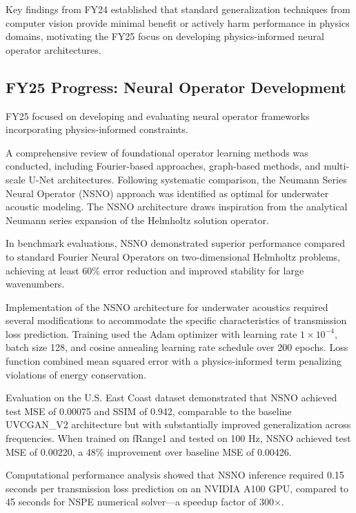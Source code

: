 \documentclass{article}
\begin{document}
Key findings from FY24 established that standard generalization techniques from computer vision provide minimal benefit or actively harm performance in physics domains, motivating the FY25 focus on developing physics-informed neural operator architectures.

\subsection{FY25 Progress: Neural Operator Development}

FY25 focused on developing and evaluating neural operator frameworks incorporating physics-informed constraints.

A comprehensive review of foundational operator learning methods was conducted, including Fourier-based approaches, graph-based methods, and multi-scale U-Net architectures. Following systematic comparison, the Neumann Series Neural Operator (NSNO) approach was identified as optimal for underwater acoustic modeling. The NSNO architecture draws inspiration from the analytical Neumann series expansion of the Helmholtz solution operator.

In benchmark evaluations, NSNO demonstrated superior performance compared to standard Fourier Neural Operators on two-dimensional Helmholtz problems, achieving at least 60\% error reduction and improved stability for large wavenumbers.

Implementation of the NSNO architecture for underwater acoustics required several modifications to accommodate the specific characteristics of transmission loss prediction. Training used the Adam optimizer with learning rate $1 \times 10^{-4}$, batch size 128, and cosine annealing learning rate schedule over 200 epochs. Loss function combined mean squared error with a physics-informed term penalizing violations of energy conservation.

Evaluation on the U.S. East Coast dataset demonstrated that NSNO achieved test MSE of 0.00075 and SSIM of 0.942, comparable to the baseline UVCGAN\_V2 architecture but with substantially improved generalization across frequencies. When trained on fRange1 and tested on 100 Hz, NSNO achieved test MSE of 0.00220, a 48\% improvement over baseline MSE of 0.00426.

Computational performance analysis showed that NSNO inference required 0.15 seconds per transmission loss prediction on an NVIDIA A100 GPU, compared to 45 seconds for NSPE numerical solver—a speedup factor of 300×.
\end{document}
